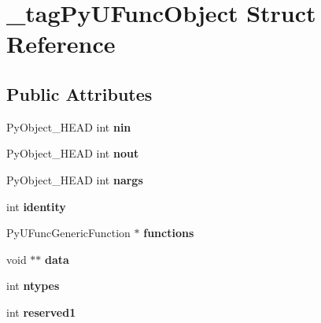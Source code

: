 \hypertarget{struct__tagPyUFuncObject}{}\section{\+\_\+tag\+Py\+U\+Func\+Object Struct Reference}
\label{struct__tagPyUFuncObject}
\subsection*{Public Attributes}
\begin{DoxyCompactItemize}
\item 
Py\+Object\+\_\+\+H\+E\+AD int {\bfseries nin}\hypertarget{struct__tagPyUFuncObject_af3c53cd1c615f06f90b73573f569709d}{}\label{struct__tagPyUFuncObject_af3c53cd1c615f06f90b73573f569709d}

\item 
Py\+Object\+\_\+\+H\+E\+AD int {\bfseries nout}\hypertarget{struct__tagPyUFuncObject_a50287f22915ef1394c0ef9ac1b0873d4}{}\label{struct__tagPyUFuncObject_a50287f22915ef1394c0ef9ac1b0873d4}

\item 
Py\+Object\+\_\+\+H\+E\+AD int {\bfseries nargs}\hypertarget{struct__tagPyUFuncObject_ae39e94118b13ed17d6ef0e0027cbe1a7}{}\label{struct__tagPyUFuncObject_ae39e94118b13ed17d6ef0e0027cbe1a7}

\item 
int {\bfseries identity}\hypertarget{struct__tagPyUFuncObject_a3a051b99d188ed3ca2fa0c7242d6a0b5}{}\label{struct__tagPyUFuncObject_a3a051b99d188ed3ca2fa0c7242d6a0b5}

\item 
Py\+U\+Func\+Generic\+Function $\ast$ {\bfseries functions}\hypertarget{struct__tagPyUFuncObject_a107dfa708f68429265b29e7efa18b67c}{}\label{struct__tagPyUFuncObject_a107dfa708f68429265b29e7efa18b67c}

\item 
void $\ast$$\ast$ {\bfseries data}\hypertarget{struct__tagPyUFuncObject_ad3fbce5042bc19513c9742a6022fec69}{}\label{struct__tagPyUFuncObject_ad3fbce5042bc19513c9742a6022fec69}

\item 
int {\bfseries ntypes}\hypertarget{struct__tagPyUFuncObject_a4e1c22d7d754a4a5c041f36207f8f9fc}{}\label{struct__tagPyUFuncObject_a4e1c22d7d754a4a5c041f36207f8f9fc}

\item 
int {\bfseries reserved1}\hypertarget{struct__tagPyUFuncObject_ae957a691faed6057cefb980eee6b836d}{}\label{struct__tagPyUFuncObject_ae957a691faed6057cefb980eee6b836d}


\end{DoxyCompactItemize}
